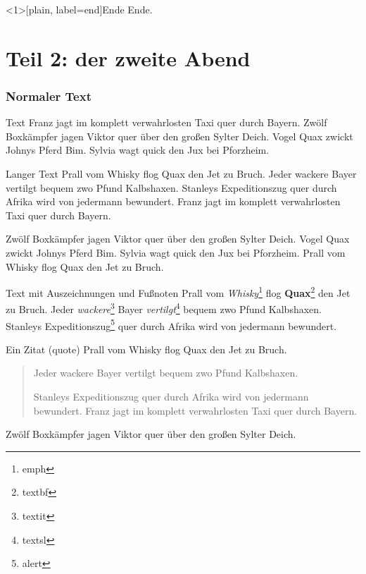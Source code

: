 \documentclass[ngerman]{scrartcl}
\begin{document}
	\begin{frame}[plain, label=end]{Ende}
		\Huge{Ende.}
	\end{frame}








	\part{Teil 2: der zweite Abend}

	\frame{\partpage}

	\section{Normaler Text}

	\begin{frame}{Text}
		Franz jagt im komplett verwahrlosten Taxi quer durch Bayern.
		Zwölf Boxkämpfer jagen Viktor quer über den großen Sylter Deich.
		Vogel Quax zwickt Johnys Pferd Bim.
		Sylvia wagt quick den Jux bei Pforzheim.
	\end{frame}

	\begin{frame}{Langer Text}
		Prall vom Whisky flog Quax den Jet zu Bruch.
		Jeder wackere Bayer vertilgt bequem zwo Pfund Kalbshaxen.
		Stanleys Expeditionszug quer durch Afrika wird von jedermann bewundert.
		Franz jagt im komplett verwahrlosten Taxi quer durch Bayern.

		Zwölf Boxkämpfer jagen Viktor quer über den großen Sylter Deich.
		Vogel Quax zwickt Johnys Pferd Bim.
		Sylvia wagt quick den Jux bei Pforzheim.
		Prall vom Whisky flog Quax den Jet zu Bruch.
	\end{frame}

	\begin{frame}{Text mit Auszeichnungen und Fußnoten}
		Prall vom \emph{Whisky}\footnote{emph} flog \textbf{Quax}\footnote{textbf} den Jet zu Bruch.
		Jeder \textit{wackere}\footnote{textit} Bayer \textsl{vertilgt}\footnote{textsl} bequem zwo Pfund Kalbshaxen.
		Stanleys \alert{Expeditionszug}\footnote{alert} quer durch Afrika wird von jedermann bewundert.
	\end{frame}

	\begin{frame}{Ein Zitat (quote)}
		Prall vom Whisky flog Quax den Jet zu Bruch.

		\begin{quote}
			Jeder wackere Bayer vertilgt bequem zwo Pfund Kalbshaxen.

			Stanleys Expeditionszug quer durch Afrika wird von jedermann bewundert.
			Franz jagt im komplett verwahrlosten Taxi quer durch Bayern.
		\end{quote}

		Zwölf Boxkämpfer jagen Viktor quer über den großen Sylter Deich.
	\end{frame}
\end{document}
